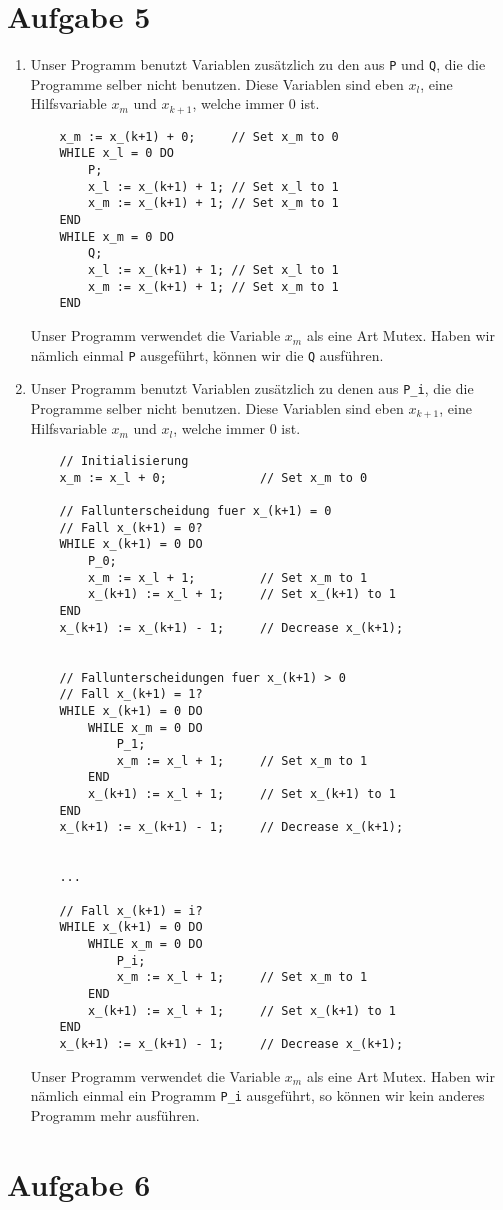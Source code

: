 \documentclass[a4paper,11pt]{scrartcl}
\begin{document}
	\section*{Aufgabe 5}
	\begin{enumerate}[label=\alph*)]
	\item	Unser Programm benutzt Variablen zusätzlich zu den aus \verb|P| und \verb|Q|, die die Programme selber nicht benutzen. Diese Variablen sind eben $x_l$, eine Hilfsvariable $x_m$ und $x_{k+1}$, welche immer $0$ ist.
	\begin{lstlisting}
	x_m := x_(k+1) + 0;		// Set x_m to 0
	WHILE x_l = 0 DO
		P;
		x_l := x_(k+1) + 1;	// Set x_l to 1
		x_m := x_(k+1) + 1;	// Set x_m to 1
	END
	WHILE x_m = 0 DO
		Q;
		x_l := x_(k+1) + 1;	// Set x_l to 1
		x_m := x_(k+1) + 1;	// Set x_m to 1
	END
	\end{lstlisting}
	Unser Programm verwendet die Variable $x_m$ als eine Art Mutex. Haben wir nämlich einmal \verb|P| ausgeführt, können wir die \verb|Q| ausführen.
	
	\newpage	
	
	\item	Unser Programm benutzt Variablen zusätzlich zu denen aus \verb|P_i|, die die Programme selber nicht benutzen. Diese Variablen sind eben $x_{k+1}$, eine Hilfsvariable $x_m$ und $x_l$, welche immer $0$ ist.
	\begin{lstlisting}
	// Initialisierung
	x_m := x_l + 0;				// Set x_m to 0
	
	// Fallunterscheidung fuer x_(k+1) = 0
	// Fall x_(k+1) = 0?
	WHILE x_(k+1) = 0 DO
		P_0;
		x_m := x_l + 1;			// Set x_m to 1
		x_(k+1) := x_l + 1;		// Set x_(k+1) to 1
	END
	x_(k+1) := x_(k+1) - 1;		// Decrease x_(k+1);
	
	
	// Fallunterscheidungen fuer x_(k+1) > 0
	// Fall x_(k+1) = 1?
	WHILE x_(k+1) = 0 DO
		WHILE x_m = 0 DO
			P_1;
			x_m := x_l + 1;		// Set x_m to 1
		END
		x_(k+1) := x_l + 1;		// Set x_(k+1) to 1
	END 
	x_(k+1) := x_(k+1) - 1;		// Decrease x_(k+1);
	
	
	...	
	
	// Fall x_(k+1) = i?
	WHILE x_(k+1) = 0 DO
		WHILE x_m = 0 DO
			P_i;
			x_m := x_l + 1;		// Set x_m to 1
		END
		x_(k+1) := x_l + 1;		// Set x_(k+1) to 1
	END 
	x_(k+1) := x_(k+1) - 1;		// Decrease x_(k+1);
	\end{lstlisting}
	Unser Programm verwendet die Variable $x_m$ als eine Art Mutex. Haben wir nämlich einmal ein Programm \verb|P_i| ausgeführt, so können wir kein anderes Programm mehr ausführen.
	\end{enumerate}
	
	
	\newpage
	\section*{Aufgabe 6}
\end{document}

